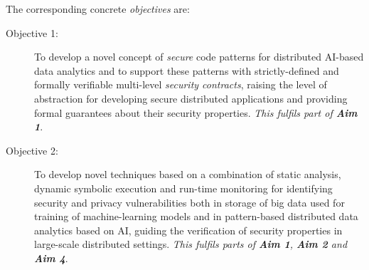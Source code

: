 \documentclass[a4paper,11pt]{article}
\begin{document}
The corresponding concrete \emph{objectives} are: 
\begin{description}

 
\item[Objective 1:] To develop a novel concept of \emph{secure} code patterns for distributed AI-based data analytics and to support these
patterns with strictly-defined and formally verifiable multi-level 
\emph{security contracts}, raising the level of abstraction
for developing secure distributed applications and providing formal guarantees about their security properties. 
\emph{This fulfils part of \textbf{Aim 1}}. 

\item[Objective 2:] To develop novel techniques based on a combination of static analysis, dynamic symbolic execution and run-time monitoring for identifying security and privacy vulnerabilities both in storage of big data used for training of machine-learning models and in pattern-based distributed data analytics based on AI, guiding the verification of security properties in large-scale distributed settings. \emph{This fulfils parts of \textbf{Aim 1}, \textbf{Aim 2} and \textbf{Aim 4}}.
  

\end{description}
\end{document}
